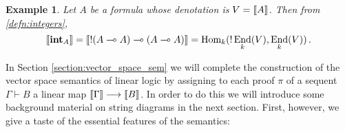 \documentclass[english,letter paper,12pt,reqno]{article}
\theoremstyle{example}
\newtheorem{example}[theorem]{Example}
\numberwithin{equation}{section}
\def\Hom{\operatorname{Hom}}
\DeclareMathOperator{\End}{End}
\def\inta{\bold{int}}
\begin{document}

\begin{example}\label{example:denotation_2}  Let $A$ be a formula whose denotation is $V = \llbracket A \rrbracket$. Then from \eqref{defn:integers},
\[
\den{\inta_A} = \den{ {!}( A \multimap A) \multimap (A \multimap A)} = \Hom_k( {!} \End_k(V), \End_k(V) )\,.
\]
\end{example}

In Section \ref{section:vector_space_sem} we will complete the construction of the vector space semantics of linear logic by assigning to each proof $\pi$ of a sequent $\Gamma \vdash B$ a linear map $\llbracket \Gamma \rrbracket \longrightarrow \llbracket B \rrbracket$. In order to do this we will introduce some background material on string diagrams in the next section. First, however, we give a taste of the essential features of the semantics:
\end{document}
